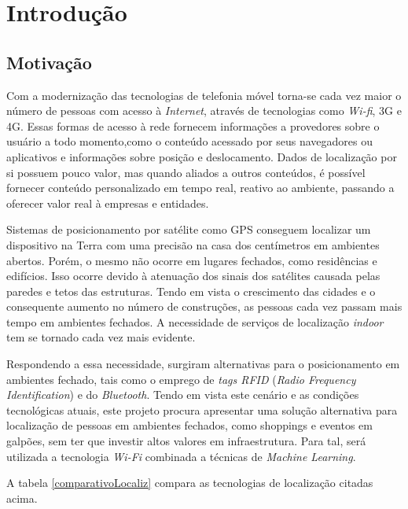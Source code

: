 \chapter{Introdução}\label{chp:introduction}

\section{Motivação}\label{sec:motivation}
Com a modernização das tecnologias de telefonia móvel torna-se cada vez maior o
número de pessoas com acesso à \textit{Internet}, através de tecnologias como \textit{Wi-fi},
3G e 4G. Essas formas de acesso à rede fornecem informações a provedores sobre o
usuário a todo momento,como o conteúdo acessado por seus navegadores ou aplicativos
e informações sobre posição e deslocamento. Dados de localização por si possuem
pouco valor, mas quando aliados a outros conteúdos, é possível fornecer conteúdo
personalizado em tempo real, reativo ao ambiente, passando a oferecer valor real
à empresas e entidades.
\par
Sistemas de posicionamento por satélite como GPS conseguem localizar um dispositivo
na Terra com uma precisão na casa dos centímetros em ambientes abertos. Porém,
o mesmo não ocorre em lugares fechados, como residências e edifícios. Isso ocorre
devido à atenuação dos sinais dos satélites causada pelas paredes e tetos das
estruturas. Tendo em vista o crescimento das cidades e o consequente aumento no
número de construções, as pessoas cada vez passam mais tempo em ambientes
fechados. A necessidade de serviços de localização \textit{indoor} tem se tornado cada
vez mais evidente.
\par
Respondendo a essa necessidade, surgiram alternativas para o posicionamento em
ambientes fechado, tais como o emprego de \textit{tags RFID} (\textit{Radio Frequency Identification}) e do \textit{Bluetooth}. Tendo em vista este
cenário e as condições tecnológicas atuais, este projeto procura apresentar uma
solução alternativa para localização de pessoas em ambientes fechados, como shoppings e
eventos em galpões, sem ter que investir altos valores em infraestrutura. Para tal, será utilizada a tecnologia \textit{Wi-Fi} combinada a técnicas de \textit{Machine Learning}.
\par
A tabela \ref{comparativoLocaliz} compara as tecnologias de localização citadas acima.

